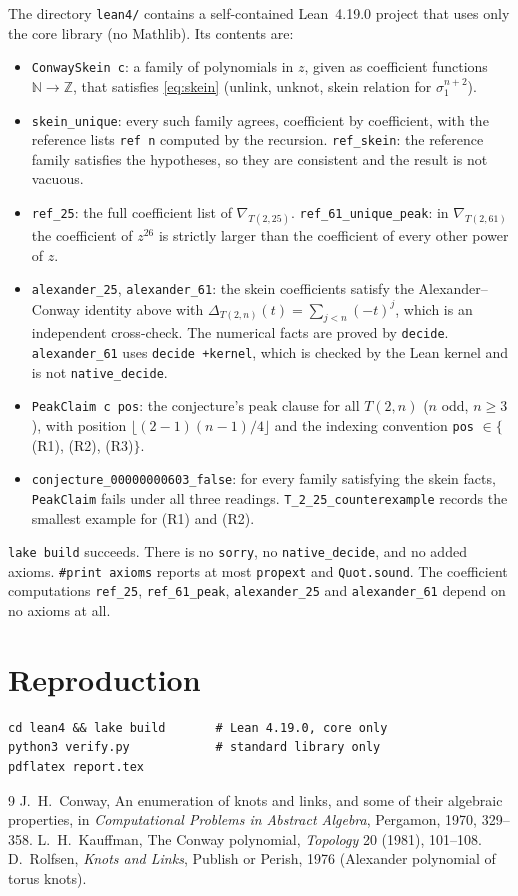 \documentclass[11pt]{article}
\theoremstyle{definition}
\theoremstyle{remark}
\begin{document}
The directory \texttt{lean4/} contains a self-contained Lean~4.19.0 project
that uses only the core library (no Mathlib). Its contents are:
\begin{itemize}
\item \texttt{ConwaySkein c}: a family of polynomials in $z$, given as
coefficient functions $\mathbb N\to\mathbb Z$, that satisfies \eqref{eq:skein}
(unlink, unknot, skein relation for $\sigma_1^{n+2}$).
\item \texttt{skein\_unique}: every such family agrees, coefficient by
coefficient, with the reference lists \texttt{ref n} computed by the
recursion. \texttt{ref\_skein}: the reference family satisfies the
hypotheses, so they are consistent and the result is not vacuous.
\item \texttt{ref\_25}: the full coefficient list of $\nabla_{T(2,25)}$.
\texttt{ref\_61\_unique\_peak}: in $\nabla_{T(2,61)}$ the coefficient of
$z^{26}$ is strictly larger than the coefficient of every other power of $z$.
\item \texttt{alexander\_25}, \texttt{alexander\_61}: the skein coefficients
satisfy the Alexander--Conway identity above with
$\Delta_{T(2,n)}(t)=\sum_{j<n}(-t)^j$, which is an independent cross-check.
The numerical facts are proved by \texttt{decide}. \texttt{alexander\_61}
uses \texttt{decide +kernel}, which is checked by the Lean kernel and is not
\texttt{native\_decide}.
\item \texttt{PeakClaim c pos}: the conjecture's peak clause for all $T(2,n)$
($n$ odd, $n\ge3$), with position $\lfloor (2-1)(n-1)/4\rfloor$ and the
indexing convention \texttt{pos} $\in\{$(R1), (R2), (R3)$\}$.
\item \texttt{conjecture\_00000000603\_false}: for every family satisfying
the skein facts, \texttt{PeakClaim} fails under all three readings.
\texttt{T\_2\_25\_counterexample} records the smallest example for (R1) and (R2).
\end{itemize}
\texttt{lake build} succeeds. There is no \texttt{sorry}, no
\texttt{native\_decide}, and no added axioms. \texttt{\#print axioms} reports at
most \texttt{propext} and \texttt{Quot.sound}. The coefficient computations
\texttt{ref\_25}, \texttt{ref\_61\_peak}, \texttt{alexander\_25} and
\texttt{alexander\_61} depend on no axioms at all.

\section{Reproduction}
\begin{verbatim}
cd lean4 && lake build       # Lean 4.19.0, core only
python3 verify.py            # standard library only
pdflatex report.tex
\end{verbatim}

\begin{thebibliography}{9}
 J.~H.~Conway, An enumeration of knots and links, and some of
their algebraic properties, in \emph{Computational Problems in Abstract
Algebra}, Pergamon, 1970, 329--358.
 L.~H.~Kauffman, The Conway polynomial,
\emph{Topology} 20 (1981), 101--108.
 D.~Rolfsen, \emph{Knots and Links}, Publish or Perish, 1976
(Alexander polynomial of torus knots).
\end{thebibliography}
\end{document}

